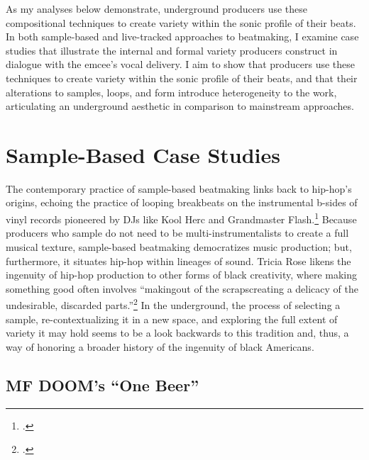 As my analyses below demonstrate, underground producers use these compositional techniques to
create  variety within the sonic profile of their beats. In both sample-based and live-tracked
approaches to beatmaking, I examine case studies that illustrate the internal and formal variety
producers construct in dialogue with the emcee's vocal delivery. I aim to show that producers 
use these techniques to create variety within the sonic profile of their beats, and that their
alterations to samples, loops, and form introduce heterogeneity to the work, articulating an 
underground aesthetic in comparison to mainstream approaches.

\section{Sample-Based Case Studies} \label{samplebased}
The contemporary practice of sample-based beatmaking links back to hip-hop's origins, echoing
the practice of looping breakbeats on the instrumental b-sides of vinyl records pioneered by
DJs like Kool Herc and Grandmaster Flash.\footnote{
    \autocite[51]{triciaroseBlackNoiseRap1994}.} 
Because producers who sample do not need to be multi-instrumentalists to create a full musical
texture, sample-based  beatmaking democratizes music production; but, furthermore, it situates
hip-hop within lineages of sound. Tricia Rose likens the ingenuity of hip-hop production to other
forms of black creativity, where making something good often involves ``making\textellipsis out
of the scraps\textemdash creating a delicacy of the undesirable, discarded parts.''\footnote{
    \autocite[264]{triciaroseHipHopWarsWhat2008}.} 
In the underground, the process of selecting a sample, re-contextualizing it in a new space, and
exploring the full extent of variety it may hold seems to be a look backwards to this tradition 
and, thus, a way of honoring a broader history of the ingenuity of black Americans.

\subsection*{\centering MF DOOM's ``One Beer''}  

